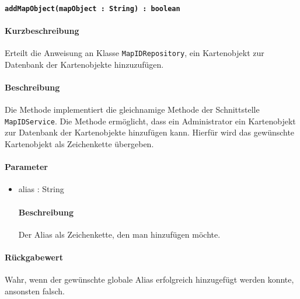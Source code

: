 \paragraph{\texttt{addMapObject(mapObject : String) : boolean}}%
\paragraph*{Kurzbeschreibung}
Erteilt die Anweisung an Klasse \texttt{MapIDRepository}, ein Kartenobjekt zur Datenbank der Kartenobjekte hinzuzufügen.
\paragraph*{Beschreibung}
Die Methode implementiert die gleichnamige Methode der Schnittstelle \texttt{MapIDService}.
Die Methode ermöglicht, dass ein Administrator ein Kartenobjekt zur Datenbank der Kartenobjekte hinzufügen kann.
Hierfür wird das gewünschte Kartenobjekt als Zeichenkette übergeben.
\paragraph*{Parameter}
\begin{itemize}
    \item alias : String
    		\paragraph*{Beschreibung}
    		Der Alias als Zeichenkette, den man hinzufügen möchte.
\end{itemize}
\paragraph*{Rückgabewert}
Wahr, wenn der gewünschte globale Alias erfolgreich hinzugefügt werden konnte, ansonsten falsch.
